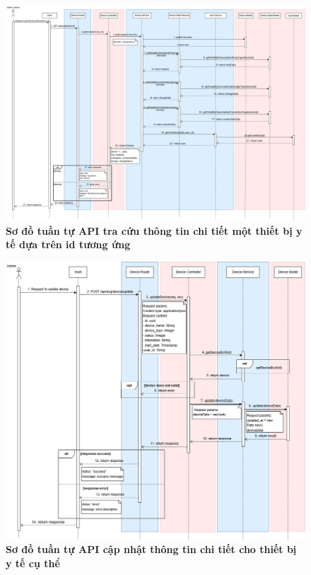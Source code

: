 \begin{figure}[H]
	\centering
	\includegraphics[width=16cm]{Images/api_sequence/device/device-GetDeviceById.drawio.png}
	\caption[Sơ đồ tuần tự API tra cứu thông tin chi tiết một thiết bị y tế dựa trên id tương ứng]{\bfseries \fontsize{12pt}{0pt}\selectfont Sơ đồ tuần tự API tra cứu thông tin chi tiết một thiết bị y tế dựa trên id tương ứng}
	\label{sequence_diagram_add_device}
\end{figure}

\begin{figure}[H]
	\centering
	\includegraphics[width=16cm]{Images/api_sequence/device/device-updateDevice.drawio.png}
	\caption[Sơ đồ tuần tự API cập nhật thông tin chi tiết cho thiết bị y tế cụ thể]{\bfseries \fontsize{12pt}{0pt}\selectfont Sơ đồ tuần tự API cập nhật thông tin chi tiết cho thiết bị y tế cụ thể}
	\label{sequence_diagram_update_device}
\end{figure}

